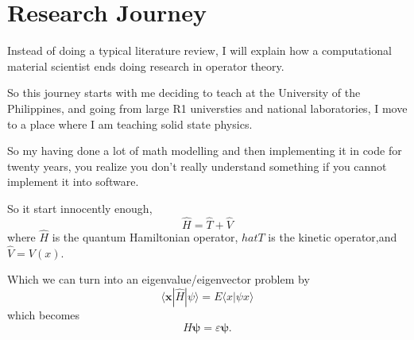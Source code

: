 \section{Research Journey}

Instead of doing a typical literature review, I will explain how a computational material scientist ends doing research in operator theory.

So this journey starts with me deciding to teach at the University of the Philippines, and going from large R1 universties and national laboratories, I move to a place where I am teaching solid state physics.

So my having done a lot of math modelling and then implementing it in code for twenty years, you realize you don't really understand something if you cannot implement it into software.

So it start innocently enough,
$$
  \hat{H} = \hat{T} + \hat{V}
$$
where $\hat{H}$ is the quantum Hamiltonian operator, $hat{T}$ is the kinetic operator,and $\hat{V}=V(x)$.

Which we can turn into an eigenvalue/eigenvector problem by
\begin{equation}
  \langle{\mathbf{x}}|{\hat{H}}| \psi \rangle
  = E \langle x | \psi x \rangle
\end{equation}
which becomes
$$
  H \boldsymbol{\psi} = \varepsilon \boldsymbol{\psi}.
$$
